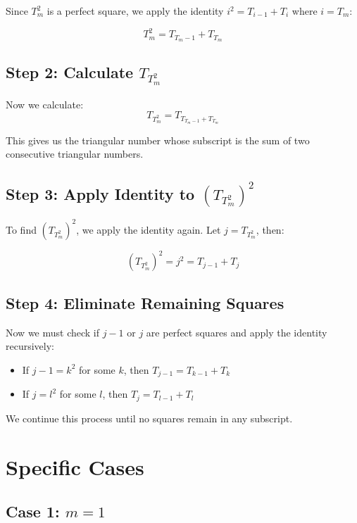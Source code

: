 \documentclass{article}
\begin{document}
Since $T_m^2$ is a perfect square, we apply the identity $i^2 = T_{i-1} + T_i$ where $i = T_m$:

\begin{equation}
T_m^2 = T_{T_m-1} + T_{T_m}
\end{equation}

\subsection{Step 2: Calculate $T_{T_m^2}$}

Now we calculate:
\begin{equation}
T_{T_m^2} = T_{T_{T_m-1} + T_{T_m}}
\end{equation}

This gives us the triangular number whose subscript is the sum of two consecutive triangular numbers.

\subsection{Step 3: Apply Identity to $(T_{T_m^2})^2$}

To find $(T_{T_m^2})^2$, we apply the identity again. Let $j = T_{T_m^2}$, then:

\begin{equation}
(T_{T_m^2})^2 = j^2 = T_{j-1} + T_j
\end{equation}

\subsection{Step 4: Eliminate Remaining Squares}

Now we must check if $j-1$ or $j$ are perfect squares and apply the identity recursively:

\begin{itemize}
\item If $j-1 = k^2$ for some $k$, then $T_{j-1} = T_{k-1} + T_k$
\item If $j = l^2$ for some $l$, then $T_j = T_{l-1} + T_l$
\end{itemize}

We continue this process until no squares remain in any subscript.

\section{Specific Cases}

\subsection{Case 1: $m = 1$}
\end{document}
